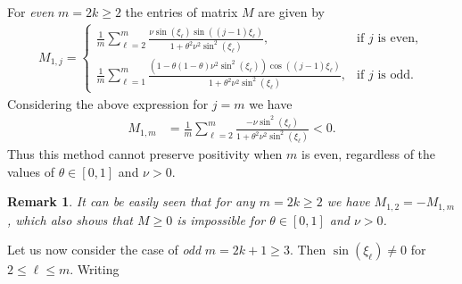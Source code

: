 \documentclass[a4paper]{article}
\newtheorem{remark}{Remark}
\newcommand{\te}{\theta}
\begin{document}
\begin{description}[style=unboxed,leftmargin=0cm]
\item [\emph{Case 1:} $m$ is \emph{even}.]
\item \noindent For \emph{even} $m=2k\ge 2$ the entries of matrix $M$ are given by
\begin{align*}
	M_{1,j} = \begin{cases}
				\displaystyle
				\frac{1}{m} \sum_{\ell=2}^{m} \frac{\nu \sin(\xi_\ell)\sin((j-1)\xi_\ell)}
					{1+\theta^2\nu^2 \sin^2 (\xi_\ell)}, &\mbox{if } j \text{ is even}, \\[20pt]
				\displaystyle
				\frac{1}{m} \sum_{\ell=1}^{m}\frac{\left(1-\theta(1-\theta)\nu^2\sin^2(\xi_\ell)
					\right)\cos((j-1)\xi_\ell)}{1+\theta^2\nu^2\sin^2(\xi_\ell)}, &\mbox{if } j
					\text{ is odd}.
			  \end{cases}
\end{align*}
Considering  the above expression for $j = m$ we have
\begin{align*}
    M_{1,m} & =  \frac{1}{m} \sum_{\ell=2}^{m} \frac{- \nu \sin^2 (\xi_\ell)}{1+\theta^2\nu^2 \sin^2 (\xi_\ell)} < 0.
\end{align*}
Thus this method cannot preserve positivity when $m$ is even, regardless of the values
of $\theta\in[0,1]$ and $\nu>0$.
\begin{remark}
It can be easily seen that for any $m=2k\ge 2$ we have $M_{1,2}=-M_{1,m}$, which also shows that $M\ge 0$
is impossible for $\te\in[0,1]$ and $\nu>0$.
\end{remark}
\item [\emph{Case 2:} $m$ is \emph{odd}.]
\item \noindent Let us now consider the case of \emph{odd} $m=2k+1\ge 3$. Then $\sin(\xi_\ell)\ne0$ for
$2\le\ell\le m$.
 Writing
\begin{align*} 

\end{align*}
\end{description}
\end{document}
